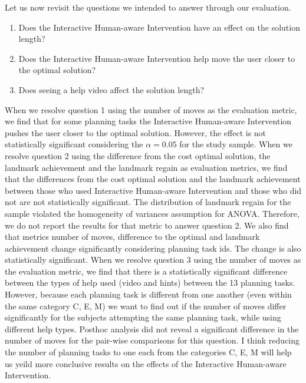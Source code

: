 Let us now revisit the questions we intended to answer through our evaluation.
\begin{enumerate}
\item Does the Interactive Human-aware Intervention have an effect on the solution length?
\item Does the Interactive Human-aware Intervention help move the user closer to the optimal solution?
\item Does seeing a help video affect the solution length?
\end{enumerate}
When we resolve question 1 using the number of moves as the evaluation metric, we find that for some planning tasks the Interactive Human-aware Intervention pushes the user closer to the optimal solution. However, the effect is not statistically significant considering the $\alpha=0.05$ for the study sample.
When we resolve question 2 using the difference from the cost optimal solution, the landmark achievement and the landmark regain as evaluation metrics, we find that the differences from the cost optimal solution and the landmark achievement between those who used Interactive Human-aware Intervention and those who did not are not statistically significant.
The distribution of landmark regain for the sample violated the homogeneity  of variances assumption for ANOVA. 
Therefore, we do not report the results for that metric to answer question 2.
We also find that metrics number of moves, difference to the optimal and landmark achievement change significantly considering planning task ids.
The change is also statistically significant.
When we resolve question 3 using the number of moves as the evaluation metric, we find that there is a statistically significant difference between the types of help used (video and hints) between the 13 planning tasks.
However, because each planning task is different from one another (even within the same category C, E, M) we want to find out if the number of moves differ significantly for the subjects attempting the same planning task, while using different help types.
Posthoc analysis did not reveal a significant difference in the number of moves for the pair-wise comparisons for this question.
I think reducing the number of planning tasks to one each from the categories C, E, M will help us yeild more conclusive results on the effects of the Interactive Human-aware Intervention.



